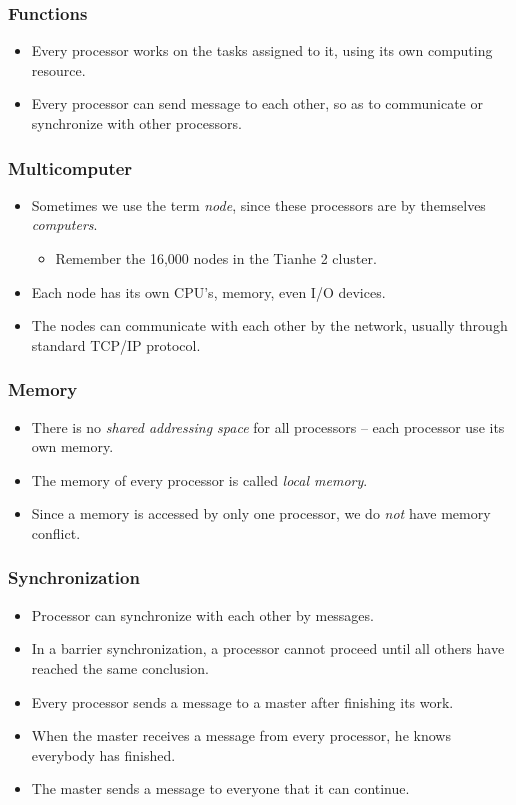 \documentclass{beamer}
\begin{document}
\begin{CJK}{UTF8}{bsmi}
\begin{frame}
\frametitle{Functions} 
\begin{itemize}
\item Every processor works on the tasks assigned to it, using its own
  computing resource.
\item Every processor can send message to each other, so as to
  communicate or synchronize with other processors.
\end{itemize}
\end{frame}

\begin{frame}
\frametitle{Multicomputer}
\begin{itemize}
\item Sometimes we use the term {\em node}, since these processors are
  by themselves {\em computers}.
  \begin{itemize}
    \item Remember the 16,000 nodes in the Tianhe 2 cluster.
  \end{itemize}
\item Each node has its own CPU's, memory, even I/O devices.
\item The nodes can communicate with each other by the network, usually
  through standard TCP/IP protocol.
\end{itemize}
\end{frame}


\begin{frame}
\frametitle{Memory}
\begin{itemize}
\item There is no {\em shared addressing space} for all processors --
  each processor use its own memory.
\item The memory of every processor is called {\em local memory}.
\item Since a memory is accessed by only one processor, we do {\em
  not} have memory conflict.
\end{itemize}
\end{frame}

\begin{frame}
\frametitle{Synchronization}
\begin{itemize}
\item Processor can synchronize with each other by messages.
\item In a barrier synchronization, a processor cannot proceed until
  all others have reached the same conclusion.
\item Every processor sends a message to a master after finishing its work.
\item When the master receives a message from every processor, he knows everybody has finished.
\item The master sends a message to everyone that it can continue.
\end{itemize}
\end{frame}


\end{CJK}
\end{document}
